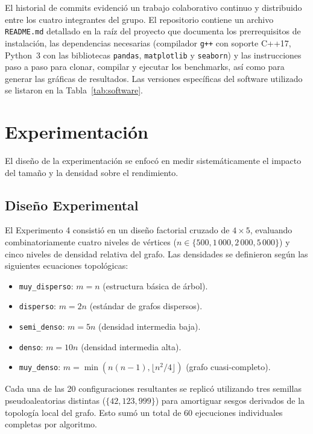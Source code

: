 \documentclass[conference]{IEEEtran}
\begin{document}
El historial de commits evidenció un trabajo colaborativo continuo y distribuido entre los cuatro integrantes del grupo. El repositorio contiene un archivo \texttt{README.md} detallado en la raíz del proyecto que documenta los prerrequisitos de instalación, las dependencias necesarias (compilador \texttt{g++} con soporte C++17, Python~3 con las bibliotecas \texttt{pandas}, \texttt{matplotlib} y \texttt{seaborn}) y las instrucciones paso a paso para clonar, compilar y ejecutar los benchmarks, así como para generar las gráficas de resultados. Las versiones específicas del software utilizado se listaron en la Tabla~\ref{tab:software}.

\section{Experimentación}

El diseño de la experimentación se enfocó en medir sistemáticamente el impacto del tamaño y la densidad sobre el rendimiento.

\subsection{Diseño Experimental}

El Experimento 4 consistió en un diseño factorial cruzado de $4 \times 5$, evaluando combinatoriamente cuatro niveles de vértices ($n \in \{500, 1\,000, 2\,000, 5\,000\}$) y cinco niveles de densidad relativa del grafo. Las densidades se definieron según las siguientes ecuaciones topológicas:
\begin{itemize}
    \item \texttt{muy\_disperso}: $m = n$ (estructura básica de árbol).
    \item \texttt{disperso}: $m = 2n$ (estándar de grafos dispersos).
    \item \texttt{semi\_denso}: $m = 5n$ (densidad intermedia baja).
    \item \texttt{denso}: $m = 10n$ (densidad intermedia alta).
    \item \texttt{muy\_denso}: $m = \min(n(n-1), \lfloor n^2/4\rfloor)$ (grafo cuasi-completo).
\end{itemize}

Cada una de las 20 configuraciones resultantes se replicó utilizando tres semillas pseudoaleatorias distintas ($\{42, 123, 999\}$) para amortiguar sesgos derivados de la topología local del grafo. Esto sumó un total de 60 ejecuciones individuales completas por algoritmo.
\end{document}
